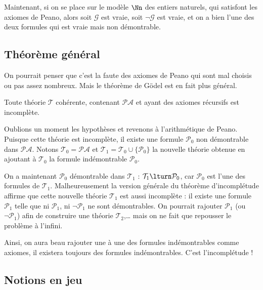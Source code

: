\documentclass[11pt,class=report,crop=false]{standalone}
\begin{document}
Maintenant, si on se place sur le modèle $\Nn$ des entiers naturels, qui satisfont les axiomes de Peano, alors soit $\mathcal{G}$ est vraie, soit $\lnot\mathcal{G}$ est vraie, et on a bien l'une des deux formules qui est vraie mais non démontrable.


\subsection{Théorème général}

On pourrait penser que c'est la faute des axiomes de Peano qui sont mal choisis ou pas assez nombreux. Mais le théorème de Gödel est en fait plus général.

\begin{theoreme}
Toute théorie $\mathcal{T}$ cohérente, contenant $\mathcal{PA}$ et ayant des axiomes récursifs est incomplète.
\end{theoreme}

Oublions un moment les hypothèses et revenons à l'arithmétique de Peano.
Puisque cette théorie est incomplète, il existe une formule $\mathcal{P}_0$ non démontrable dans $\mathcal{PA}$. Notons $\mathcal{T}_0 = \mathcal{PA}$ et $\mathcal{T}_1 = \mathcal{T}_0 \cup \{\mathcal{P}_0\}$ la nouvelle théorie obtenue en ajoutant à $\mathcal{T}_0$ la formule indémontrable $\mathcal{P}_0$.

On a maintenant $\mathcal{P}_0$ démontrable dans $\mathcal{T}_1$ : $\mathcal{T}_1 \lturn \mathcal{P}_0$, car $\mathcal{P}_0$ est l'une des formules de $\mathcal{T}_1$. Malheureusement la version générale du théorème d'incomplétude affirme que cette nouvelle théorie $\mathcal{T}_1$ est aussi incomplète : il existe une formule $\mathcal{P}_1$ telle que ni $\mathcal{P}_1$, ni $\lnot \mathcal{P}_1$ ne sont démontrables. On pourrait rajouter $\mathcal{P}_1$ (ou $\lnot\mathcal{P}_1$) afin de construire une théorie $\mathcal{T}_2$,\ldots{} mais on ne fait que repousser le problème à l'infini.

Ainsi, on aura beau rajouter une à une des formules indémontrables comme axiomes, il existera toujours des formules indémontrables. C'est l'incomplétude !


\subsection{Notions en jeu}
\end{document}
